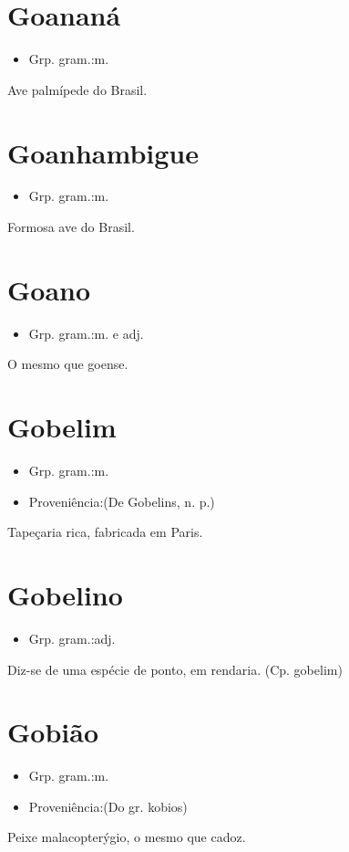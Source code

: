 \section{Goananá}
\begin{itemize}
\item {Grp. gram.:m.}
\end{itemize}
Ave palmípede do Brasil.
\section{Goanhambigue}
\begin{itemize}
\item {Grp. gram.:m.}
\end{itemize}
Formosa ave do Brasil.
\section{Goano}
\begin{itemize}
\item {Grp. gram.:m.  e  adj.}
\end{itemize}
O mesmo que \textunderscore goense\textunderscore .
\section{Gobelim}
\begin{itemize}
\item {Grp. gram.:m.}
\end{itemize}
\begin{itemize}
\item {Proveniência:(De \textunderscore Gobelins\textunderscore , n. p.)}
\end{itemize}
Tapeçaria rica, fabricada em Paris.
\section{Gobelino}
\begin{itemize}
\item {Grp. gram.:adj.}
\end{itemize}
Diz-se de uma espécie de ponto, em rendaria.
(Cp. \textunderscore gobelim\textunderscore )
\section{Gobião}
\begin{itemize}
\item {Grp. gram.:m.}
\end{itemize}
\begin{itemize}
\item {Proveniência:(Do gr. \textunderscore kobios\textunderscore )}
\end{itemize}
Peixe malacopterýgio, o mesmo que \textunderscore cadoz\textunderscore .
